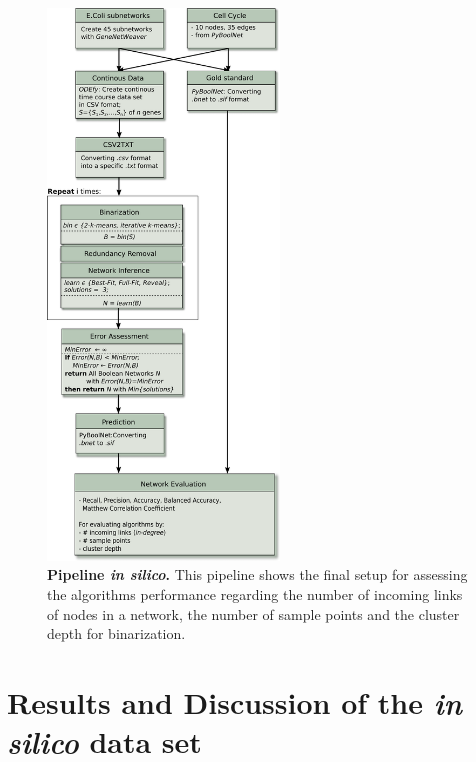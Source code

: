 \begin{figure}[H]
\centering
\includegraphics[width=0.55\textwidth]{./Bilder/pipeline_insilico.pdf}
\caption[Pipeline \textit{in silico}]{\textbf{Pipeline \textit{in silico}. }This pipeline shows the final setup for assessing the algorithms performance regarding the number of incoming links of nodes in a network, the number of sample points and the cluster depth for binarization.}
\label{fig:9}
\end{figure}



\section{Results and Discussion of the \textit{in silico} data set}

